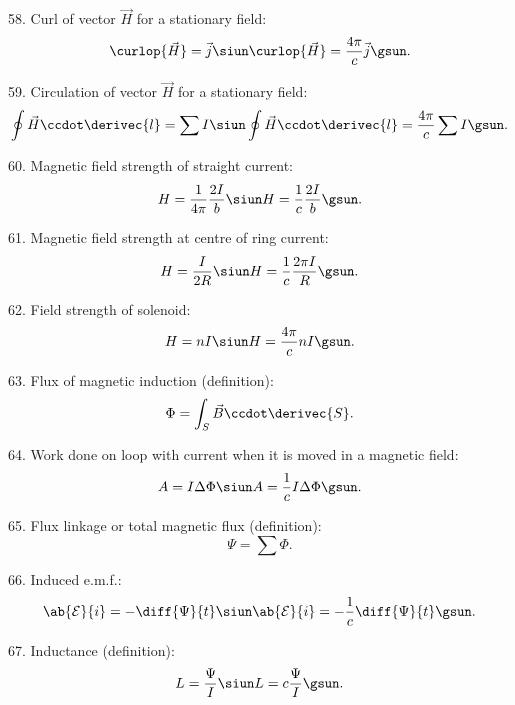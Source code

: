 58. Curl of vector $\vec{H}$ for a stationary field:
\begin{equation*}
	\curlop{\vec{H}} = \vec{j} \siun \curlop{\vec{H}} = \frac{4\pi}{c} \vec{j} \gsun.
\end{equation*}

59. Circulation of vector $\vec{H}$ for a stationary field:
\begin{equation*}
	\oint \vec{H}\ccdot\derivec{l} = \sum I \siun \oint \vec{H}\ccdot\derivec{l} = \frac{4\pi}{c}\sum I \gsun.
\end{equation*}

60. Magnetic field strength of straight current:
\begin{equation*}
	H = \frac{1}{4\pi}\frac{2I}{b} \siun H = \frac{1}{c}\frac{2I}{b} \gsun.
\end{equation*}

61. Magnetic field strength at centre of ring current:
\begin{equation*}
	H = \frac{I}{2R} \siun H = \frac{1}{c} \frac{2\pi I}{R} \gsun.
\end{equation*}

62. Field strength of solenoid:
\begin{equation*}
	H = nI \siun H = \frac{4\pi}{c} nI \gsun.
\end{equation*}

63. Flux of magnetic induction (definition):
\begin{equation*}
	\Phi = \int_S \vec{B}\ccdot\derivec{S}.
\end{equation*}

64. Work done on loop with current when it is moved in a magnetic field:
\begin{equation*}
	A = I \Delta{\Phi} \siun A = \frac{1}{c} I \Delta{\Phi} \gsun.
\end{equation*}

65. Flux linkage or total magnetic flux (definition):
\begin{equation*}
	\Psi = \sum\Phi.
\end{equation*}

66. Induced e.m.f.:
\begin{equation*}
	\ab{\mathcal{E}}{i}=-\diff{\Psi}{t} \siun \ab{\mathcal{E}}{i}=- \frac{1}{c}\diff{\Psi}{t} \gsun.
\end{equation*}

67. Inductance (definition):
\begin{equation*}
	L = \frac{\Psi}{I} \siun L = c \frac{\Psi}{I} \gsun.
\end{equation*}

